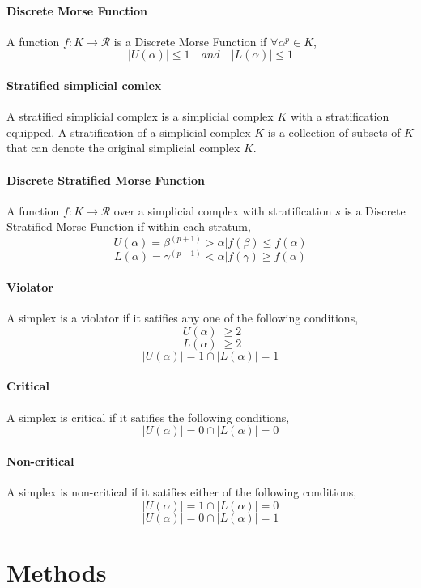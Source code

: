 \documentclass[12pt]{article}
\begin{document}
\paragraph{Discrete Morse Function} A function $f: K \rightarrow \mathcal{R}$ is a Discrete Morse Function if $\forall \alpha^{p} \in K$,
$$|U(\alpha)| \le 1 \quad and \quad |L(\alpha)| \le 1$$

\paragraph{Stratified simplicial comlex} A stratified simplicial complex is a simplicial complex $K$ with a stratification equipped. A stratification of a simplicial complex $K$ is a collection of subsets of $K$ that can denote the original simplicial complex $K$.

\paragraph{Discrete Stratified Morse Function} A function $f: K \rightarrow \mathcal{R}$ over a simplicial complex with stratification $s$ is a Discrete Stratified Morse Function if within each stratum,
$$U(\alpha) = {\beta^{(p+1)} > \alpha | f(\beta) \le f(\alpha)}$$
$$L(\alpha) = {\gamma^{(p−1)} < \alpha | f(\gamma) \ge f(\alpha)}$$

\paragraph{Violator} A simplex is a violator if it satifies any one of the following conditions,
$$|U(\alpha)| \ge 2$$
$$|L(\alpha)| \ge 2$$
$$|U(\alpha)| = 1 \cap |L(\alpha)| = 1$$

\paragraph{Critical} A simplex is critical if it satifies the following conditions,
$$|U(\alpha)| = 0 \cap |L(\alpha)| = 0$$

\paragraph{Non-critical} A simplex is non-critical  if it satifies either of the following conditions,
$$|U(\alpha)| = 1 \cap |L(\alpha)| = 0$$
$$|U(\alpha)| = 0 \cap |L(\alpha)| = 1$$

\section{Methods}
\end{document}
